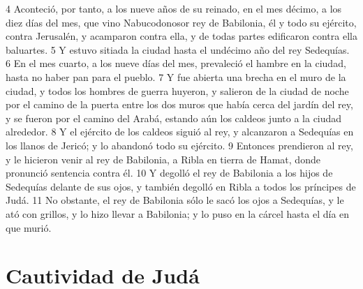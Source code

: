 4 Aconteció, por tanto, a los nueve años de su reinado, en el mes décimo, a los diez días del mes, que vino Nabucodonosor rey de Babilonia, él y todo su ejército, contra Jerusalén, y acamparon contra ella, y de todas partes edificaron contra ella baluartes.
5 Y estuvo sitiada la ciudad hasta el undécimo año del rey Sedequías.
6 En el mes cuarto, a los nueve días del mes, prevaleció el hambre en la ciudad, hasta no haber pan para el pueblo.
7 Y fue abierta una brecha en el muro de la ciudad, y todos los hombres de guerra huyeron, y salieron de la ciudad de noche por el camino de la puerta entre los dos muros que había cerca del jardín del rey, y se fueron por el camino del Arabá, estando aún los caldeos junto a la ciudad alrededor.
8 Y el ejército de los caldeos siguió al rey, y alcanzaron a Sedequías en los llanos de Jericó; y lo abandonó todo su ejército.
9 Entonces prendieron al rey, y le hicieron venir al rey de Babilonia, a Ribla en tierra de Hamat, donde pronunció sentencia contra él.
10 Y degolló el rey de Babilonia a los hijos de Sedequías delante de sus ojos, y también degolló en Ribla a todos los príncipes de Judá.
11 No obstante, el rey de Babilonia sólo le sacó los ojos a Sedequías, y le ató con grillos, y lo hizo llevar a Babilonia; y lo puso en la cárcel hasta el día en que murió.

\section*{Cautividad de Judá}

